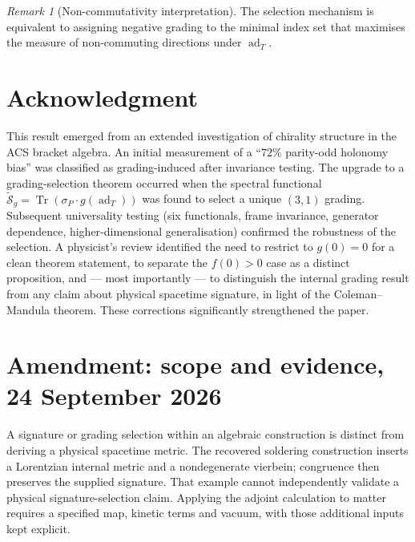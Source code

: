\documentclass[11pt]{article}
\theoremstyle{plain}
\theoremstyle{definition}
\theoremstyle{remark}
\newtheorem*{remark}{Remark}
\newcommand{\ad}{\operatorname{ad}}
\newcommand{\Tr}{\operatorname{Tr}}
\begin{document}
\begin{remark}[Non-commutativity interpretation]
The selection mechanism is equivalent to assigning negative
grading to the minimal index set that maximises the measure of
non-commuting directions under $\ad_T$.
\end{remark}

\section*{Acknowledgment}

This result emerged from an extended investigation of chirality
structure in the ACS bracket algebra.  An initial measurement of a
``$72\%$ parity-odd holonomy bias'' was classified as
grading-induced after invariance testing.  The upgrade to a
grading-selection theorem occurred when the spectral functional
$\widetilde{\mathcal{S}}_g = \Tr(\sigma_P \cdot g(\ad_T))$ was
found to select a unique $(3,1)$ grading.  Subsequent universality
testing (six functionals, frame invariance, generator dependence,
higher-dimensional generalisation) confirmed the robustness of the
selection.  A physicist's review identified the need to restrict to
$g(0) = 0$ for a clean theorem statement, to separate the $f(0) > 0$
case as a distinct proposition, and --- most importantly --- to
distinguish the internal grading result from any claim about
physical spacetime signature, in light of the Coleman--Mandula
theorem.  These corrections significantly strengthened the paper.


\section*{Amendment: scope and evidence, 24 September 2026}
A signature or grading selection within an algebraic construction is distinct from deriving a physical spacetime metric. The recovered soldering construction inserts a Lorentzian internal metric and a nondegenerate vierbein; congruence then preserves the supplied signature. That example cannot independently validate a physical signature-selection claim. Applying the adjoint calculation to matter requires a specified map, kinetic terms and vacuum, with those additional inputs kept explicit.
\end{document}

